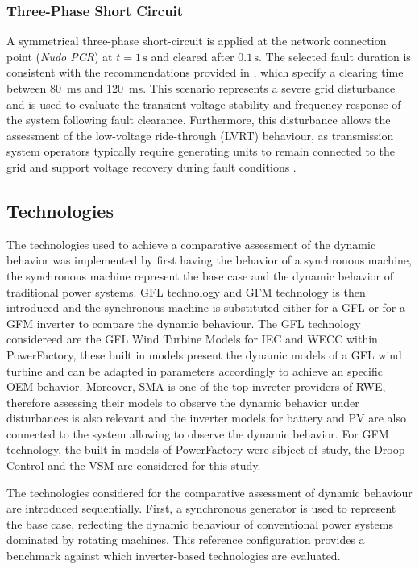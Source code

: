\subsubsection{Three-Phase Short Circuit}
A symmetrical three-phase short-circuit is applied at the network connection point (\textit{Nudo PCR}) at $t = 1\,\mathrm{s}$ and cleared after $0.1\,\mathrm{s}$. The selected fault duration is consistent with the recommendations provided in \cite{REE_NTS_2016_631_v21}, which specify a clearing time between 80~ms and 120~ms.
This scenario represents a severe grid disturbance and is used to evaluate the transient voltage stability and frequency response of the system following fault clearance. Furthermore, this disturbance allows the assessment of the low-voltage ride-through
(LVRT) behaviour, as transmission system operators typically require generating units to remain connected to the grid and support voltage recovery during fault conditions \cite{entsoe2016}.


\subsection{Technologies}
The technologies used to achieve a comparative assessment of the dynamic behavior was implemented by first having the behavior of a synchronous machine, the synchronous machine represent the base case and the dynamic behavior of traditional power systems. GFL technology and GFM technology is then introduced and the synchronous machine is substituted either for a GFL or for a GFM inverter to compare the dynamic behaviour. The GFL technology considereed are the GFL Wind Turbine Models for IEC and WECC within PowerFactory, these built in models present the dynamic models of a GFL wind turbine and can be adapted in parameters accordingly to achieve an specific OEM behavior. Moreover, SMA is one of the top invreter providers of RWE, therefore assessing their models to observe the dynamic behavior under disturbances is also relevant and the inverter models for battery and PV are also connected to the system allowing to observe the dynamic behavior. For GFM technology, the built in models of PowerFactory were sibject of study, the Droop Control and the VSM are considered for this study.



The technologies considered for the comparative assessment of dynamic behaviour are introduced sequentially. First, a synchronous generator is used to represent the base case, reflecting the dynamic behaviour of conventional power systems dominated by rotating machines. This reference configuration provides a benchmark against which inverter-based technologies are evaluated.

